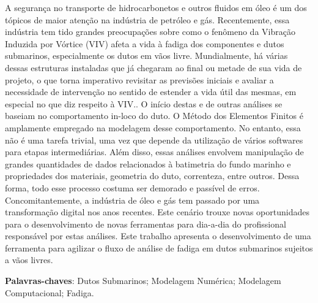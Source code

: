 
\setlength{\absparsep}{18pt} %
\begin{resumo}

    A segurança no transporte de hidrocarbonetos e outros fluidos em óleo é um dos tópicos de maior atenção na indústria de petróleo e gás.
    Recentemente, essa indústria tem tido grandes preocupações sobre como o fenômeno da Vibração Induzida por Vórtice (VIV) afeta a vida à fadiga dos componentes e dutos submarinos, especialmente os dutos em vãos livre.
    Mundialmente, há várias dessas estruturas instaladas que já chegaram ao final ou metade de sua vida de projeto, o que torna imperativo revisitar as previsões iniciais e avaliar a necessidade de intervenção no sentido de estender a vida útil das mesmas, em especial no que diz respeito à VIV..
    O início destas e de outras análises se baseiam no comportamento in-loco do duto.
    O Método dos Elementos Finitos é amplamente empregado na modelagem desse comportamento.
    No entanto, essa não é uma tarefa trivial, uma vez que depende da utilização de vários softwares para etapas intermediárias.
    Além disso, essas análises envolvem manipulação de grandes quantidades de dados relacionados à batimetria do fundo marinho e propriedades dos materiais, geometria do duto, correnteza, entre outros.
    Dessa forma, todo esse processo costuma ser demorado e passível de erros.
    Concomitantemente, a indústria de óleo e gás tem passado por uma transformação digital nos anos recentes.
    Este cenário trouxe novas oportunidades para o desenvolvimento de novas ferramentas para dia-a-dia do profissional responsável por estas análises.
    Este trabalho apresenta o desenvolvimento de uma ferramenta para agilizar o fluxo de análise de fadiga em dutos submarinos sujeitos a vãos livres.



 \textbf{Palavras-chaves}: Dutos Submarinos; Modelagem Numérica; Modelagem Computacional; Fadiga.
\end{resumo}


